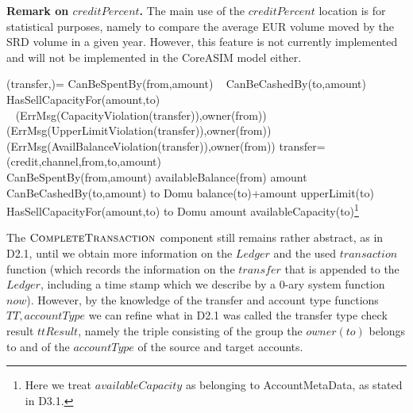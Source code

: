{\bf Remark on $creditPercent$.} The main use of the $creditPercent$ location is for statistical purposes, namely to compare the average EUR volume moved by the SRD volume in a given year. However, this feature is not currently implemented and will not be implemented in the CoreASIM model either.


\begin{asm}
(transfer,)=\+
   \IF CanBeSpentBy(from,amount) \+
      \THEN ~ \IF CanBeCashedBy(to,amount) \+
         \THEN ~ \IF HasSellCapacityFor(amount,to) \+
            \THEN ~  \\
            \ELSE 
             ~ (ErrMsg(CapacityViolation(transfer)),\TO owner(from))\-
         \ELSE 
         ~ (ErrMsg(UpperLimitViolation(transfer)),\TO owner(from))\-
      \ELSE 
      ~ (ErrMsg(AvailBalanceViolation(transfer)),\TO owner(from))\dec\-
      \WHERE \+
transfer=(credit,channel,from,to,amount)\\
CanBeSpentBy(from,amount) \IFF availableBalance(from) \geq amount \\
CanBeCashedBy(to,amount) \IFF  
    to \not \in Domu \AND balance(to)+amount \leq upperLimit(to) \\
 HasSellCapacityFor(amount,to) \IFF  to \not \in Domu \AND   amount \leq availableCapacity(to)\footnote{Here we treat $availableCapacity$ as belonging to AccountMetaData, as stated in D3.1.}
\end{asm}


The $\hbox{\sc CompleteTransaction}$ component still remains rather abstract, as in D2.1, until we obtain more information on the $Ledger$ and the used  $transaction$ function (which records the information on the $transfer$ that is appended to the $Ledger$, including a time stamp which we describe by a 0-ary system function $now$). However, by the knowledge of the transfer and account type functions $TT, accountType$ we can refine what in D2.1 was called the transfer type check result $ttResult$, namely the triple consisting of the group the $owner(to)$ belongs to and of the $accountType$ of the source and target accounts.

